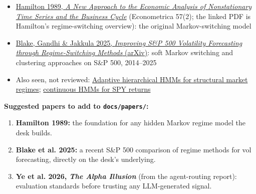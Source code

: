 \documentclass{article}
\begin{document}
\begin{itemize}

\item \href{https://econweb.ucsd.edu/~jhamilto/palgrav1.pdf}{Hamilton 1989, \emph{A New Approach to the Economic Analysis of Nonstationary Time Series and the Business Cycle}} (Econometrica 57(2); the linked PDF is Hamilton's regime-switching overview): the original Markov-switching model

\item \href{https://arxiv.org/abs/2510.03236}{Blake, Gandhi \& Jakkula 2025, \emph{Improving S\&P 500 Volatility Forecasting through Regime-Switching Methods} (arXiv)}: soft Markov switching and clustering approaches on S\&P 500, 2014--2025

\item Also seen, not reviewed: \href{https://www.mdpi.com/1911-8074/19/1/15}{Adaptive hierarchical HMMs for structural market regimes}; \href{https://arxiv.org/pdf/2606.23492}{continuous HMMs for SPY returns}

\end{itemize}

\textbf{Suggested papers to add to \texttt{docs/\allowbreak{}papers/\allowbreak{}}:}

\begin{enumerate}

\item \textbf{Hamilton 1989:} the foundation for any hidden Markov regime model the desk builds.

\item \textbf{Blake et al. 2025:} a recent S\&P 500 comparison of regime methods for vol forecasting, directly on the desk's underlying.

\item \textbf{Ye et al. 2026, \emph{The Alpha Illusion}} (from the agent-routing report): evaluation standards before trusting any LLM-generated signal.

\end{enumerate}
\end{document}
